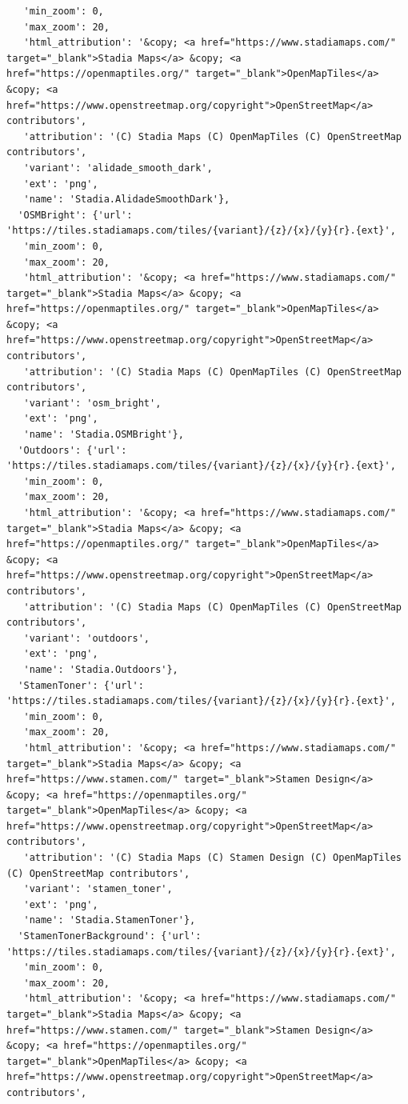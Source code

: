 \documentclass[
  letterpaper,
  DIV=11,
  numbers=noendperiod]{scrreprt}
\begin{document}
\begin{verbatim}
   'min_zoom': 0,
   'max_zoom': 20,
   'html_attribution': '&copy; <a href="https://www.stadiamaps.com/" target="_blank">Stadia Maps</a> &copy; <a href="https://openmaptiles.org/" target="_blank">OpenMapTiles</a> &copy; <a href="https://www.openstreetmap.org/copyright">OpenStreetMap</a> contributors',
   'attribution': '(C) Stadia Maps (C) OpenMapTiles (C) OpenStreetMap contributors',
   'variant': 'alidade_smooth_dark',
   'ext': 'png',
   'name': 'Stadia.AlidadeSmoothDark'},
  'OSMBright': {'url': 'https://tiles.stadiamaps.com/tiles/{variant}/{z}/{x}/{y}{r}.{ext}',
   'min_zoom': 0,
   'max_zoom': 20,
   'html_attribution': '&copy; <a href="https://www.stadiamaps.com/" target="_blank">Stadia Maps</a> &copy; <a href="https://openmaptiles.org/" target="_blank">OpenMapTiles</a> &copy; <a href="https://www.openstreetmap.org/copyright">OpenStreetMap</a> contributors',
   'attribution': '(C) Stadia Maps (C) OpenMapTiles (C) OpenStreetMap contributors',
   'variant': 'osm_bright',
   'ext': 'png',
   'name': 'Stadia.OSMBright'},
  'Outdoors': {'url': 'https://tiles.stadiamaps.com/tiles/{variant}/{z}/{x}/{y}{r}.{ext}',
   'min_zoom': 0,
   'max_zoom': 20,
   'html_attribution': '&copy; <a href="https://www.stadiamaps.com/" target="_blank">Stadia Maps</a> &copy; <a href="https://openmaptiles.org/" target="_blank">OpenMapTiles</a> &copy; <a href="https://www.openstreetmap.org/copyright">OpenStreetMap</a> contributors',
   'attribution': '(C) Stadia Maps (C) OpenMapTiles (C) OpenStreetMap contributors',
   'variant': 'outdoors',
   'ext': 'png',
   'name': 'Stadia.Outdoors'},
  'StamenToner': {'url': 'https://tiles.stadiamaps.com/tiles/{variant}/{z}/{x}/{y}{r}.{ext}',
   'min_zoom': 0,
   'max_zoom': 20,
   'html_attribution': '&copy; <a href="https://www.stadiamaps.com/" target="_blank">Stadia Maps</a> &copy; <a href="https://www.stamen.com/" target="_blank">Stamen Design</a> &copy; <a href="https://openmaptiles.org/" target="_blank">OpenMapTiles</a> &copy; <a href="https://www.openstreetmap.org/copyright">OpenStreetMap</a> contributors',
   'attribution': '(C) Stadia Maps (C) Stamen Design (C) OpenMapTiles (C) OpenStreetMap contributors',
   'variant': 'stamen_toner',
   'ext': 'png',
   'name': 'Stadia.StamenToner'},
  'StamenTonerBackground': {'url': 'https://tiles.stadiamaps.com/tiles/{variant}/{z}/{x}/{y}{r}.{ext}',
   'min_zoom': 0,
   'max_zoom': 20,
   'html_attribution': '&copy; <a href="https://www.stadiamaps.com/" target="_blank">Stadia Maps</a> &copy; <a href="https://www.stamen.com/" target="_blank">Stamen Design</a> &copy; <a href="https://openmaptiles.org/" target="_blank">OpenMapTiles</a> &copy; <a href="https://www.openstreetmap.org/copyright">OpenStreetMap</a> contributors',

\end{verbatim}
\end{document}
